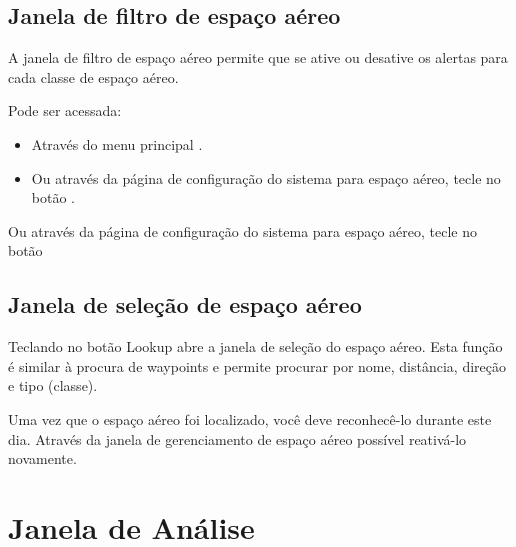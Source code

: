 

\subsection*{Janela de filtro de espaço aéreo}\label{sec:airspace-filter}

A janela de filtro de espaço aéreo permite que se ative ou desative os alertas para cada classe de espaço aéreo.  

Pode ser acessada:
\begin{itemize}
\item Através do menu principal   \blink{}.
\item Ou através da página de configuração do sistema para espaço aéreo, tecle no botão .
\end{itemize}

Ou através da página de configuração do sistema para espaço aéreo, tecle no botão

\subsection*{Janela de seleção de espaço aéreo}

Teclando no botão Lookup abre a janela de seleção do espaço aéreo.  Esta função é similar à procura de waypoints e permite procurar por nome, distância, direção e tipo (classe).

Uma vez que o espaço aéreo foi localizado, você deve reconhecê-lo durante este dia.  Através da janela de gerenciamento de espaço aéreo possível reativá-lo novamente.


\section{Janela de Análise}


